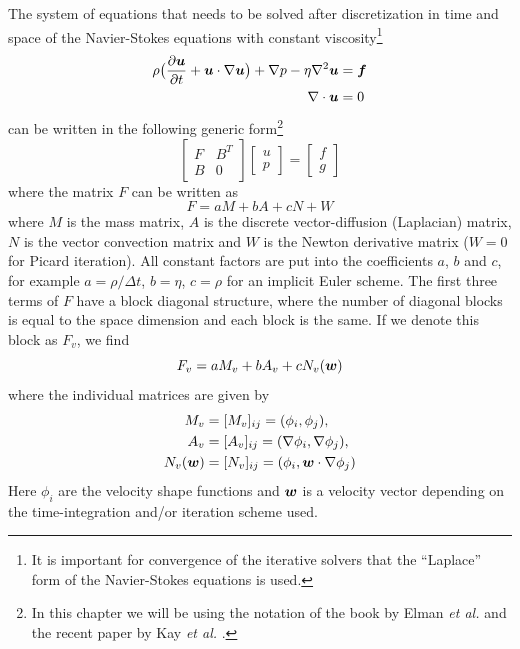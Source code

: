 The system of equations that needs to be solved after discretization in time
and space of the Navier-Stokes equations with constant 
viscosity\footnote{It is important for convergence of the iterative solvers
 that the
``Laplace'' form of the Navier-Stokes equations is used.}
\begin{align}
 \rho \big( \frac{\partial \boldsymbol{u}}{\partial t} +
     \boldsymbol{u} \cdot \nabla \boldsymbol{u} \big) + \nabla p 
         - \eta \nabla^2 \boldsymbol{u} &=\boldsymbol{f} \label{eq:ns1} \\
\nabla \cdot \boldsymbol{u} &= 0
\label{eq:ns2}
\end{align} 
can be written in the following generic
form\footnote{In this chapter we will be using the notation of the book
by Elman \emph{et al.} \cite{Elman05} and the recent paper by Kay \emph{et al.}
\cite{Kay08}.}
\begin{equation}
  \begin{bmatrix}
    F & B^T \\ 
    B & 0
  \end{bmatrix}
  \begin{bmatrix}
     u \\ p
  \end{bmatrix}=
  \begin{bmatrix}
     f \\ g
  \end{bmatrix}
 \label{eq:systemns}
\end{equation}
where the matrix $F$ can be written as
\begin{equation}
   F = a M + b A + c N + W
\end{equation}
where $M$ is the mass matrix, $A$ is the discrete vector-diffusion (Laplacian)
matrix, $N$ is the vector convection matrix and
$W$ is the Newton derivative
matrix ($W=0$ for Picard iteration). All constant factors are put into 
the coefficients $a$, $b$ and $c$, for example $a=\rho/\Delta t$, $b=\eta$,
$c=\rho$ for an implicit Euler scheme. The first three terms of $F$ have a
block diagonal structure, where the number of diagonal blocks is equal to the
space dimension and each block is the same. If we denote this block 
as $F_v$, we find
\begin{equation}
   F_v = a M_v + b A_v + c N_v(\boldsymbol{w})
\end{equation}
where the individual matrices are given by
\begin{align}
   M_v&=[M_v]_{ij}=(\phi_i,\phi_j), \\
   A_v&=[A_v]_{ij}=(\nabla\phi_i,\nabla\phi_j),  \\
   N_v(\boldsymbol{w})&=[N_v]_{ij}=(\phi_i,\boldsymbol{w}\cdot\nabla\phi_j)
\end{align}
Here $\phi_i$ are the velocity shape functions and
$\boldsymbol{w}$ is a velocity vector depending on the time-integration and/or
iteration scheme used.

